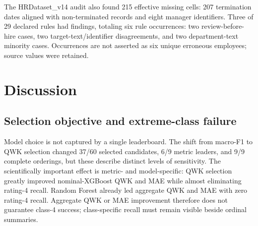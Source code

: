 \documentclass[information,article,submit,pdftex,moreauthors]{Definitions/mdpi}
\begin{document}
\begin{table}[H]
\centering\scriptsize
\caption{HR target-alias sensitivity with matched evaluation population}
\label{tab:11}
\end{table}

The HRDataset\_v14 audit also found 215 effective missing cells: 207 termination dates aligned with non-terminated records and eight manager identifiers. Three of 29 declared rules had findings, totaling six rule occurrences: two review-before-hire cases, two target-text/identifier disagreements, and two department-text minority cases. Occurrences are not asserted as six unique erroneous employees; source values were retained.

\section{Discussion}

\subsection{Selection objective and extreme-class failure}

Model choice is not captured by a single leaderboard. The shift from macro-F1 to QWK selection changed 37/60 selected candidates, 6/9 metric leaders, and 9/9 complete orderings, but these describe distinct levels of sensitivity. The scientifically important effect is metric- and model-specific: QWK selection greatly improved nominal-XGBoost QWK and MAE while almost eliminating rating-4 recall. Random Forest already led aggregate QWK and MAE with zero rating-4 recall. Aggregate QWK or MAE improvement therefore does not guarantee class-4 success; class-specific recall must remain visible beside ordinal summaries.
\end{document}
